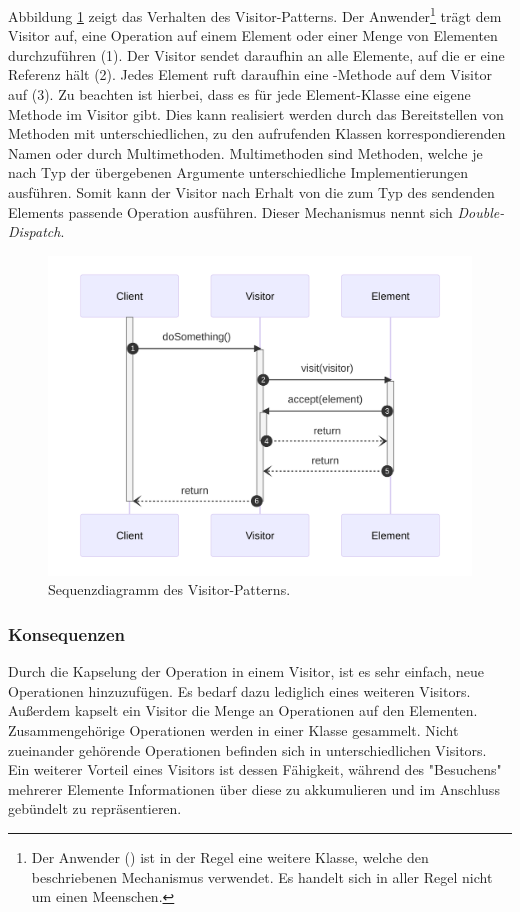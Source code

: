 Abbildung \ref{fig:visitor-seq} zeigt das Verhalten des Visitor-Patterns. Der Anwender\footnote{Der Anwender () ist in der Regel eine weitere Klasse, welche den beschriebenen Mechanismus verwendet. Es handelt sich in aller Regel nicht um einen Meenschen.} trägt dem Visitor auf, eine Operation auf einem Element oder einer Menge von Elementen durchzuführen (1). Der Visitor sendet daraufhin  an alle Elemente, auf die er eine Referenz hält (2). Jedes Element ruft daraufhin eine -Methode auf dem Visitor auf (3). Zu beachten ist hierbei, dass es für jede Element-Klasse eine eigene Methode im Visitor gibt. Dies kann realisiert werden durch das Bereitstellen von Methoden mit unterschiedlichen, zu den aufrufenden Klassen korrespondierenden Namen oder durch Multimethoden. Multimethoden sind Methoden, welche je nach Typ der übergebenen Argumente unterschiedliche Implementierungen ausführen. Somit kann der Visitor nach Erhalt von  die zum Typ des sendenden Elements passende Operation ausführen. Dieser Mechanismus nennt sich \emph{Double-Dispatch}.

\begin{figure}[htb]
	\centering
	\includegraphics[width=0.75\linewidth]{images/patterns/visitor-seq.png}
	\caption{Sequenzdiagramm des Visitor-Patterns. \cite{skobeleva_visitor_2023}}
	\label{fig:visitor-seq}
\end{figure}

\subsubsection*{Konsequenzen}
Durch die Kapselung der Operation in einem Visitor, ist es sehr einfach, neue Operationen hinzuzufügen. Es bedarf dazu lediglich eines weiteren Visitors. Außerdem kapselt ein Visitor die Menge an Operationen auf den Elementen. Zusammengehörige Operationen werden in einer Klasse gesammelt. Nicht zueinander gehörende Operationen befinden sich in unterschiedlichen Visitors. Ein weiterer Vorteil eines Visitors ist dessen Fähigkeit, während des "Besuchens" mehrerer Elemente Informationen über diese zu akkumulieren und im Anschluss gebündelt zu repräsentieren.


